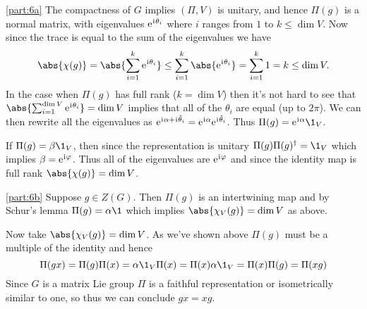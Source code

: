 \documentclass[
	pages,
	boxes,
	color=WildStrawberry
]{homework}
\begin{document}
\begin{solution}
	\ref{part:6a}
	The compactness of $G$ implies $(\Pi, V)$ is unitary, and hence $\Pi(g)$ is a normal matrix, with eigenvalues $\mathrm{e}^{\mkern1mu\mathrm{i}\mkern1mu\theta_i}$ where $i$ ranges from $1$ to $k \leq \dim V$. Now since the trace is equal to the sum of the eigenvalues we have
	\begin{equation*}
		\abs{\chi(g)} = \abs{\sum_{i=1}^k\e^{\iu\theta_i}} \leq \sum_{i=1}^k \abs{\e^{\iu \theta_i}} = \sum_{i=1}^k 1 = k \leq \dim V.
	\end{equation*}
	In the case when $\Pi(g)$ has full rank ($k = \dim V$) then it's not hard to see that $\abs{\sum_{i = 1}^{\dim V}\e^{\iu \theta_i}} = \dim V$ implies that all of the $\theta_i$ are equal (up to $2\pi$). We can then rewrite all the eigenvalues as $\mathrm{e}^{\mkern1mu\mathrm{i}\mkern1mu\alpha + \mkern1mu\mathrm{i}\mkern1mu\tilde{\theta}_i} = \mathrm{e}^{\mkern1mu\mathrm{i}\mkern1mu\alpha}\mathrm{e}^{\mkern1mu\mathrm{i}\mkern1mu\tilde{\theta}_i}$. Thus $\Pi(g) = \e^{\iu\alpha}\1_V$.

	If $\Pi(g) = \beta\1_V$, then since the representation is unitary $\Pi(g)\Pi(g)^\dagger = \1_V$ which implies $\beta = \mathrm{e}^{\mkern1mu\mathrm{i}\mkern1mu\varphi}$. Thus all of the eigenvalues are $\mathrm{e}^{\mkern1mu\mathrm{i}\mkern1mu\varphi}$ and since the identity map is full rank $\abs{\chi(g)} = \dim V$.

	\ref{part:6b}
	Suppose $g\in Z(G)$. Then $\Pi(g)$ is an intertwining map and by Schur's lemma $\Pi(g) = \alpha\1$ which implies $\abs{\chi_V(g)} = \dim V$ as above.

	Now take $\abs{\chi_V(g)} = \dim V$. As we've shown above $\Pi(g)$ must be a multiple of the identity and hence
	\begin{equation*}
		\Pi(gx) = \Pi(g)\Pi(x) = \alpha\1_V\Pi(x) = \Pi(x)\alpha\1_V = \Pi(x)\Pi(g) = \Pi(xg)
	\end{equation*}
	Since $G$ is a matrix Lie group $\Pi$ is a faithful representation or isometrically similar to one, so thus we can conclude $gx = xg$.
\end{solution}
\end{document}
